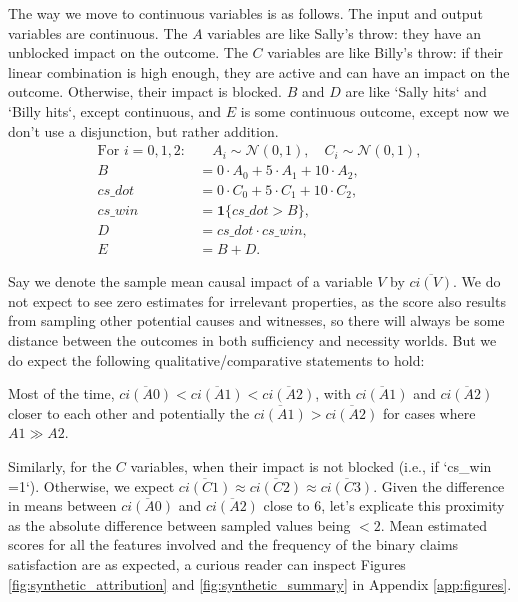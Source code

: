 \documentclass[anon,12pt]{clear2026} %
\begin{document}
\begin{example}
The way we move to continuous variables is as follows. The input and output variables are continuous. The $A$ variables are like Sally's throw: they have an unblocked impact on the outcome. The $C$ variables are like Billy's throw: if their linear combination is high enough, they are active and can have an impact on the outcome. Otherwise, their impact is blocked. $B$ and $D$ are like `Sally hits` and `Billy hits`, except continuous, and $E$ is some continuous outcome, except now we don't use a disjunction, but rather addition.
\begin{align*}
\text{For } i = 0, 1, 2: &  
\quad A_i \sim \mathcal{N}(0, 1),
\quad C_i \sim \mathcal{N}(0, 1), \\
 B & = 0 \cdot A_0 + 5 \cdot A_1 + 10 \cdot A_2, \\
 cs\_dot & = 0 \cdot C_0 + 5 \cdot C_1 + 10 \cdot C_2, \\
 cs\_win &= \mathbf{1}\{ cs\_dot > B \}, \\
 D & = cs\_dot \cdot cs\_win, \\
 E& = B + D.
\end{align*}
\end{example}

Say we denote the sample mean causal impact of a variable $V$ by $\overline{ci(V)}$. We do not expect to see zero estimates for irrelevant properties, as the score also results from sampling other potential causes and witnesses, so there will always be some distance between the outcomes in both sufficiency and necessity worlds. But we do expect the following qualitative/comparative statements to hold:

Most of the time, $\overline{ci(A0)} < \overline{ci(A1)} < \overline{ci(A2)}$, with $\overline{ci(A1)}$ and $\overline{ci(A2)}$ closer to each other and potentially the $\overline{ci(A1)} > \overline{ci(A2)}$ for cases where $A1 \gg A2$.

Similarly, for the $C$ variables, when their impact is not blocked (i.e., if `cs\_win =1`). Otherwise, we expect $\overline{ci(C1)} \approx \overline{ci(C2)} \approx \overline{ci(C3)}$. Given the difference in means between $\overline{ci(A0)}$ and $\overline{ci(A2)}$ close to $6$, let's explicate this proximity as the absolute difference between sampled values being $<2$. Mean estimated scores for all the features involved and the frequency of the binary claims satisfaction are as expected, a curious reader can inspect Figures \ref{fig:synthetic_attribution} and \ref{fig:synthetic_summary} in Appendix \ref{app:figures}.
\end{document}
